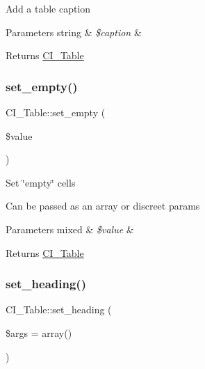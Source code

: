 Add a table caption


\begin{DoxyParams}[1]{Parameters}
string & {\em \$caption} & \\
\hline
\end{DoxyParams}
\begin{DoxyReturn}{Returns}
\mbox{\hyperlink{class_c_i___table}{C\+I\+\_\+\+Table}} 
\end{DoxyReturn}
\mbox{\label{class_c_i___table_a0cf2d8b62a5dc9f080690fb9655846f5}} 
\subsubsection{\texorpdfstring{set\+\_\+empty()}{set\_empty()}}
{\footnotesize\ttfamily C\+I\+\_\+\+Table\+::set\+\_\+empty (\begin{DoxyParamCaption}\item[{}]{\$value }\end{DoxyParamCaption})}

Set \char`\"{}empty\char`\"{} cells

Can be passed as an array or discreet params


\begin{DoxyParams}[1]{Parameters}
mixed & {\em \$value} & \\
\hline
\end{DoxyParams}
\begin{DoxyReturn}{Returns}
\mbox{\hyperlink{class_c_i___table}{C\+I\+\_\+\+Table}} 
\end{DoxyReturn}
\mbox{\label{class_c_i___table_afdb7990fbfa5d83acfc1272829209ca7}} 
\subsubsection{\texorpdfstring{set\+\_\+heading()}{set\_heading()}}
{\footnotesize\ttfamily C\+I\+\_\+\+Table\+::set\+\_\+heading (\begin{DoxyParamCaption}\item[{}]{\$args = {\ttfamily array()} }\end{DoxyParamCaption})}

